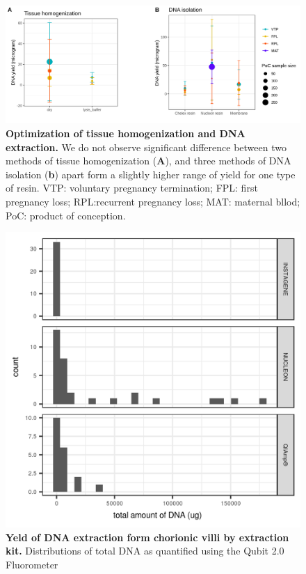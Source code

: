 \begin{figure}[ht]
    \centering
    \includegraphics[width= 14 cm, high= 16cm]{fig/panelDNA.png}
    \caption{\textbf{Optimization of tissue homogenization and DNA extraction.} We do not observe significant difference between two methods of tissue homogenization (\textbf{A}), and three methods of DNA isolation (\textbf{b}) apart form a slightly higher range of yield for one type of resin. VTP: voluntary pregnancy termination;  FPL: first pregnancy loss; RPL:recurrent pregnancy loss;  MAT: maternal bllod; PoC: product of conception.}
    \label{fig:dna}
\end{figure}

\begin{figure}[ht]
    \centering
    \includegraphics[width= 14 cm, high= 16cm]{fig/totaldna_bykit.png}
    \caption{\textbf{Yeld of DNA extraction form chorionic villi by extraction kit.} Distributions of total DNA as quantified using the  Qubit 2.0 Fluorometer} 
    \label{fig:dnayeld}
\end{figure}

